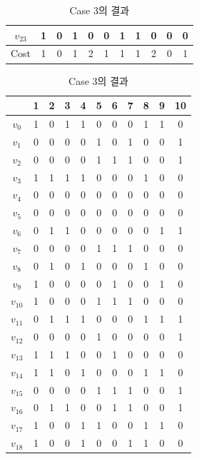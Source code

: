 \documentclass{article}
\begin{document}
\begin{table}[htb!]
\begin{minipage}{0.475\linewidth}
\begin{tabular}{c | c c c c c c c c c c}
        $v_{23}$ & 1 & 0 & 1 & 0 & 0 & 1 & 1 & 0 & 0 & 0 \\
        \hline
        Cost & 1 & 0 & 1 & 2 & 1 & 1 & 1 & 2 & 0 & 1 \\
        \hline
    \end{tabular}
    \caption{Case 3의 결과}
    \label{tab:result3}
    \end{minipage}
    \hspace{0.05\linewidth}
    \begin{minipage}{0.475\linewidth}
    \begin{tabular}{c | c c c c c c c c c c}
        \hline
        & 1 & 2 & 3 & 4 & 5 & 6 & 7 & 8 & 9 & 10 \\
        \hline
        $v_0$ & 1 & 0 & 1 & 1 & 0 & 0 & 0 & 1 & 1 & 0 \\
        $v_1$ & 0 & 0 & 0 & 0 & 1 & 0 & 1 & 0 & 0 & 1 \\
        $v_2$ & 0 & 0 & 0 & 0 & 1 & 1 & 1 & 0 & 0 & 1 \\
        $v_3$ & 1 & 1 & 1 & 1 & 0 & 0 & 0 & 1 & 0 & 0 \\
        $v_4$ & 0 & 0 & 0 & 0 & 0 & 0 & 0 & 0 & 0 & 0 \\
        $v_5$ & 0 & 0 & 0 & 0 & 0 & 0 & 0 & 0 & 0 & 0 \\
        $v_6$ & 0 & 1 & 1 & 0 & 0 & 0 & 0 & 0 & 1 & 1 \\
        $v_7$ & 0 & 0 & 0 & 0 & 1 & 1 & 1 & 0 & 0 & 0 \\
        $v_8$ & 0 & 1 & 0 & 1 & 0 & 0 & 0 & 1 & 0 & 0 \\
        $v_9$ & 1 & 0 & 0 & 0 & 0 & 1 & 0 & 0 & 1 & 0 \\
        $v_{10}$ & 1 & 0 & 0 & 0 & 1 & 1 & 1 & 0 & 0 & 0 \\
        $v_{11}$ & 0 & 1 & 1 & 1 & 0 & 0 & 0 & 1 & 1 & 1 \\
        $v_{12}$ & 0 & 0 & 0 & 0 & 1 & 0 & 0 & 0 & 0 & 1 \\
        $v_{13}$ & 1 & 1 & 1 & 0 & 0 & 1 & 0 & 0 & 0 & 0 \\
        $v_{14}$ & 1 & 1 & 0 & 1 & 0 & 0 & 0 & 1 & 1 & 0 \\
        $v_{15}$ & 0 & 0 & 0 & 0 & 1 & 1 & 1 & 0 & 0 & 1 \\
        $v_{16}$ & 0 & 1 & 1 & 0 & 0 & 1 & 1 & 0 & 0 & 1 \\
        $v_{17}$ & 1 & 0 & 0 & 1 & 1 & 0 & 0 & 1 & 1 & 0 \\
        $v_{18}$ & 1 & 0 & 0 & 1 & 0 & 0 & 1 & 1 & 0 & 0 \\

\end{tabular}
\end{minipage}
\end{table}
\end{document}
